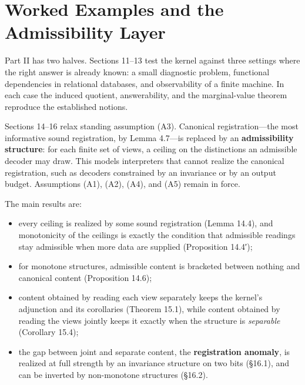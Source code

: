 \part{Worked Examples and the Admissibility Layer}


Part II has two halves. Sections 11--13 test the kernel against three settings where the right answer is already known: a small diagnostic problem, functional dependencies in relational databases, and observability of a finite machine. In each case the induced quotient, answerability, and the marginal-value theorem reproduce the established notions.

Sections 14--16 relax standing assumption (A3). Canonical registration---\hspace{0pt}the most informative sound registration, by Lemma 4.7---\hspace{0pt}is replaced by an \textbf{admissibility structure}: for each finite set of views, a ceiling on the distinctions an admissible decoder may draw. This models interpreters that cannot realize the canonical registration, such as decoders constrained by an invariance or by an output budget. Assumptions (A1), (A2), (A4), and (A5) remain in force.

The main results are:

\begin{itemize}
\tightlist
\item
  every ceiling is realized by some sound registration (Lemma 14.4), and monotonicity of the ceilings is exactly the condition that admissible readings stay admissible when more data are supplied (Proposition 14.4′);
\item
  for monotone structures, admissible content is bracketed between nothing and canonical content (Proposition 14.6);
\item
  content obtained by reading each view separately keeps the kernel's adjunction and its corollaries (Theorem 15.1), while content obtained by reading the views jointly keeps it exactly when the structure is \emph{separable} (Corollary 15.4);
\item
  the gap between joint and separate content, the \textbf{registration anomaly}, is realized at full strength by an invariance structure on two bits (§16.1), and can be inverted by non-monotone structures (§16.2).
\end{itemize}


